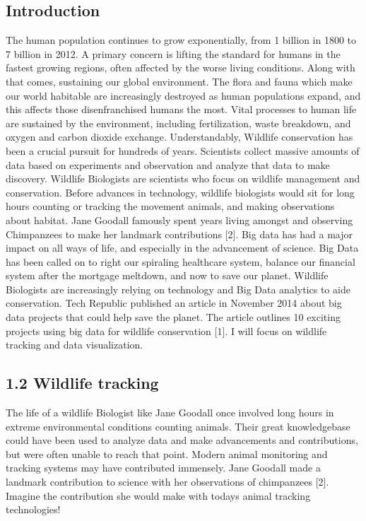 \documentclass[sigconf]{acmart}
\begin{document}
\subsection{Introduction}
The human population continues to grow exponentially, from 1 billion in 1800 to 7 billion in 2012.  A primary concern is lifting the standard for humans in the fastest growing regions, often affected by the worse living conditions.  Along with that comes, sustaining our global environment.  The flora and fauna which make our world habitable are increasingly destroyed as human populations expand, and this affects those disenfranchised humans the most.  Vital processes to human life are sustained by the environment, including fertilization, waste breakdown, and oxygen and carbon dioxide exchange.  Understandably, Wildlife conservation has been a crucial pursuit for hundreds of years. Scientists collect massive amounts of data based on experiments and observation and analyze that data to make discovery.  Wildlife Biologists are scientists who focus on wildlife management and conservation. Before advances in technology, wildlife biologists would sit for long hours counting or tracking the movement animals, and making observations about habitat.  Jane Goodall famously spent years living amongst and observing Chimpanzees to make her landmark contributions [2]. Big data has had a major impact on all ways of life, and especially in the advancement of science.  Big Data has been called on to right our spiraling healthcare system, balance our financial system after the mortgage meltdown, and now to save our planet. Wildlife Biologists are increasingly relying on technology and Big Data  analytics to aide conservation.   Tech Republic published an article in November 2014 about big data projects that could help save the planet. The article outlines 10 exciting projects using big data for wildlife conservation [1]. I will focus on wildlife tracking and data visualization.

\subsection{1.2	Wildlife tracking}
The life of a wildlife Biologist like Jane Goodall once involved long hours in extreme environmental conditions counting animals.  Their great knowledgebase could have been used to analyze data and make advancements and contributions, but were often unable to reach that point.  Modern animal monitoring and tracking systems may have contributed immensely.  Jane Goodall made a landmark contribution to science with her observations of chimpanzees [2].  Imagine the contribution she would make with todays animal tracking technologies!
\end{document}
